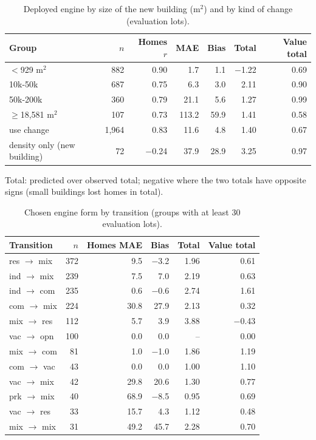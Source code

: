 \documentclass[10pt]{article}
\begin{document}
\begin{table}[t]
\centering
\footnotesize
\setlength{\tabcolsep}{4pt}
\caption{Deployed engine by size of the new building (m$^2$) and by kind of change (evaluation lots).}
\label{tab:s-ih-size}
\begin{tabular}{lrrrrrr}
\toprule
Group & $n$ & Homes $r$ & MAE & Bias & Total & Value total \\
\midrule
$<$929 m$^2$ & 882 & 0.90 & 1.7 & 1.1 & $-$1.22 & 0.69 \\
10k-50k & 687 & 0.75 & 6.3 & 3.0 & 2.11 & 0.90 \\
50k-200k & 360 & 0.79 & 21.1 & 5.6 & 1.27 & 0.99 \\
$\geq$18,581 m$^2$ & 107 & 0.73 & 113.2 & 59.9 & 1.41 & 0.58 \\
use change & 1{,}964 & 0.83 & 11.6 & 4.8 & 1.40 & 0.67 \\
density only (new building) & 72 & $-$0.24 & 37.9 & 28.9 & 3.25 & 0.97 \\
\bottomrule
\end{tabular}
\par\smallskip
\begin{minipage}{0.95\linewidth}\footnotesize Total: predicted over observed total; negative where the two totals have opposite signs (small buildings lost homes in total).\end{minipage}
\end{table}

\begin{table}[t]
\centering
\footnotesize
\setlength{\tabcolsep}{4pt}
\caption{Chosen engine form by transition (groups with at least 30 evaluation lots).}
\label{tab:s-ih-type}
\begin{tabular}{lrrrrr}
\toprule
Transition & $n$ & Homes MAE & Bias & Total & Value total \\
\midrule
res $\to$ mix & 372 & 9.5 & $-$3.2 & 1.96 & 0.61 \\
ind $\to$ mix & 239 & 7.5 & 7.0 & 2.19 & 0.63 \\
ind $\to$ com & 235 & 0.6 & $-$0.6 & 2.74 & 1.61 \\
com $\to$ mix & 224 & 30.8 & 27.9 & 2.13 & 0.32 \\
mix $\to$ res & 112 & 5.7 & 3.9 & 3.88 & $-$0.43 \\
vac $\to$ opn & 100 & 0.0 & 0.0 & -- & 0.00 \\
mix $\to$ com & 81 & 1.0 & $-$1.0 & 1.86 & 1.19 \\
com $\to$ vac & 43 & 0.0 & 0.0 & 1.00 & 1.10 \\
vac $\to$ mix & 42 & 29.8 & 20.6 & 1.30 & 0.77 \\
prk $\to$ mix & 40 & 68.9 & $-$8.5 & 0.95 & 0.69 \\
vac $\to$ res & 33 & 15.7 & 4.3 & 1.12 & 0.48 \\
mix $\to$ mix & 31 & 49.2 & 45.7 & 2.28 & 0.70 \\
\bottomrule
\end{tabular}
\end{table}
\end{document}
